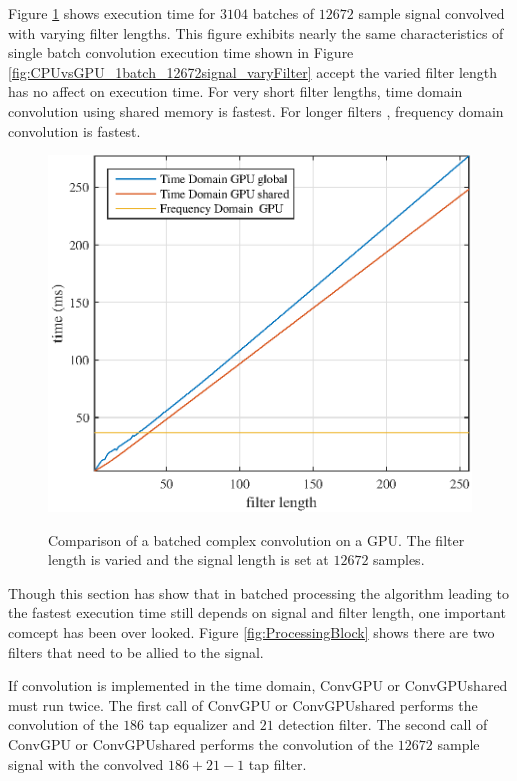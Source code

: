 Figure \ref{fig:CPUvsGPU_3104batch_12672signal_varyFilter} shows execution time for $3104$ batches of $12672$ sample signal convolved with varying filter lengths.
This figure exhibits nearly the same characteristics of single batch convolution execution time shown in Figure \ref{fig:CPUvsGPU_1batch_12672signal_varyFilter} accept the varied filter length has no affect on execution time.
For very short filter lengths, time domain convolution using shared memory is fastest.
For longer filters , frequency domain convolution is fastest.
\begin{figure}
	\caption{Comparison of a batched complex convolution on a GPU. The filter length is varied and the signal length is set at $12672$ samples.}
	\centering\includegraphics[width=5in]{figures/gpu_intro/CPUvsGPU_3104batch_12672signal_varyFilter.eps}
	\label{fig:CPUvsGPU_3104batch_12672signal_varyFilter}
\end{figure}

Though this section has show that in batched processing the algorithm leading to the fastest execution time still depends on signal and filter length,
one important comcept has been over looked.
Figure \ref{fig:ProcessingBlock} shows there are two filters that need to be allied to the signal. 

If convolution is implemented in the time domain, ConvGPU or ConvGPUshared must run twice.
The first call of ConvGPU or ConvGPUshared performs the convolution of the $186$ tap equalizer and $21$ detection filter.
The second call of ConvGPU or ConvGPUshared performs the convolution of the $12672$ sample signal with the  convolved $186+21-1$ tap filter.

